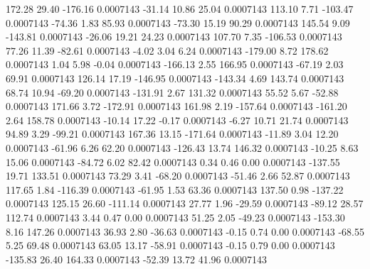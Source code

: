       172.28       29.40     -176.16     0.0007143
      -31.14       10.86       25.04     0.0007143
      113.10        7.71     -103.47     0.0007143
      -74.36        1.83       85.93     0.0007143
      -73.30       15.19       90.29     0.0007143
      145.54        9.09     -143.81     0.0007143
      -26.06       19.21       24.23     0.0007143
      107.70        7.35     -106.53     0.0007143
       77.26       11.39      -82.61     0.0007143
       -4.02        3.04        6.24     0.0007143
     -179.00        8.72      178.62     0.0007143
        1.04        5.98       -0.04     0.0007143
     -166.13        2.55      166.95     0.0007143
      -67.19        2.03       69.91     0.0007143
      126.14       17.19     -146.95     0.0007143
     -143.34        4.69      143.74     0.0007143
       68.74       10.94      -69.20     0.0007143
     -131.91        2.67      131.32     0.0007143
       55.52        5.67      -52.88     0.0007143
      171.66        3.72     -172.91     0.0007143
      161.98        2.19     -157.64     0.0007143
     -161.20        2.64      158.78     0.0007143
      -10.14       17.22       -0.17     0.0007143
       -6.27       10.71       21.74     0.0007143
       94.89        3.29      -99.21     0.0007143
      167.36       13.15     -171.64     0.0007143
      -11.89        3.04       12.20     0.0007143
      -61.96        6.26       62.20     0.0007143
     -126.43       13.74      146.32     0.0007143
      -10.25        8.63       15.06     0.0007143
      -84.72        6.02       82.42     0.0007143
        0.34        0.46        0.00     0.0007143
     -137.55       19.71      133.51     0.0007143
       73.29        3.41      -68.20     0.0007143
      -51.46        2.66       52.87     0.0007143
      117.65        1.84     -116.39     0.0007143
      -61.95        1.53       63.36     0.0007143
      137.50        0.98     -137.22     0.0007143
      125.15       26.60     -111.14     0.0007143
       27.77        1.96      -29.59     0.0007143
      -89.12       28.57      112.74     0.0007143
        3.44        0.47        0.00     0.0007143
       51.25        2.05      -49.23     0.0007143
     -153.30        8.16      147.26     0.0007143
       36.93        2.80      -36.63     0.0007143
       -0.15        0.74        0.00     0.0007143
      -68.55        5.25       69.48     0.0007143
       63.05       13.17      -58.91     0.0007143
       -0.15        0.79        0.00     0.0007143
     -135.83       26.40      164.33     0.0007143
      -52.39       13.72       41.96     0.0007143
